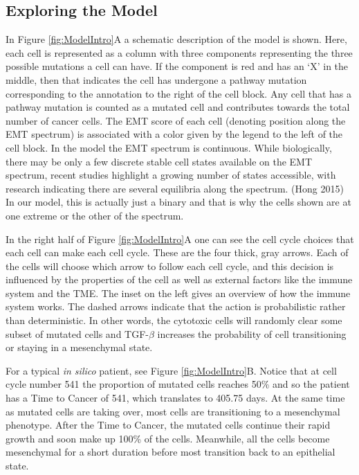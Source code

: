 \documentclass{article}
\begin{document}
\subsection{Exploring the Model}\label{ExplModel}
In Figure \ref{fig:ModelIntro}A a schematic description of the model is shown.
Here, each cell is represented as a column with three components representing the three possible mutations a cell can have.
If the component is red and has an `X' in the middle, then that indicates the cell has undergone a pathway mutation corresponding to the annotation to the right of the cell block.
Any cell that has a pathway mutation is counted as a mutated cell and contributes towards the total number of cancer cells.
The EMT score of each cell (denoting position along the EMT spectrum) is associated with a color given by the legend to the left of the cell block. 
In the model the EMT spectrum is continuous.
While biologically, there may be only a few discrete stable cell states available on the EMT spectrum, recent studies highlight a growing number of states accessible, with research indicating there are several equilibria along the spectrum. (Hong 2015)
In our model, this is actually just a binary and that is why the cells shown are at one extreme or the other of the spectrum.

In the right half of Figure \ref{fig:ModelIntro}A one can see the cell cycle choices that each cell can make each cell cycle.
These are the four thick, gray arrows.
Each of the cells will choose which arrow to follow each cell cycle, and this decision is influenced by the properties of the cell as well as external factors like the immune system and the TME.
The inset on the left gives an overview of how the immune system works.
The dashed arrows indicate that the action is probabilistic rather than deterministic.
In other words, the cytotoxic cells will randomly clear some subset of mutated cells and TGF-$\beta$ increases the probability of cell transitioning or staying in a mesenchymal state.

For a typical {\it in silico} patient, see Figure \ref{fig:ModelIntro}B.
Notice that at cell cycle number 541 the proportion of mutated cells reaches 50\% and so the patient has a Time to Cancer of 541, which translates to 405.75 days. %
At the same time as mutated cells are taking over, most cells are transitioning to  a mesenchymal phenotype.
After the Time to Cancer, the mutated cells continue their rapid growth and soon make up 100\% of the cells.
Meanwhile, all the cells become mesenchymal for a short duration before most transition back to an epithelial state.%
\end{document}
